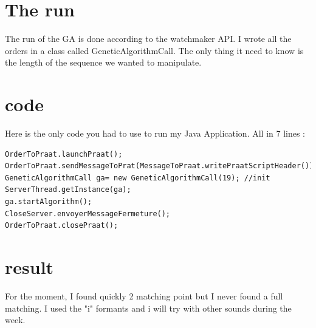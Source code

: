 \documentclass[12pt]{report}
\begin{document}
\section{The run}
The run of the GA is done according to the watchmaker API. I wrote all the orders in a class called GeneticAlgorithmCall. The only thing it need to know is the length of the sequence we wanted to manipulate.

\section{code}
Here is the only code you had to use to run my Java Application. All in 7 lines :

\begin{lstlisting}
OrderToPraat.launchPraat();
OrderToPraat.sendMessageToPrat(MessageToPraat.writePraatScriptHeader());
GeneticAlgorithmCall ga= new GeneticAlgorithmCall(19); //init
ServerThread.getInstance(ga);
ga.startAlgorithm();
CloseServer.envoyerMessageFermeture();
OrderToPraat.closePraat();
\end{lstlisting}

\section{result}
For the moment, I found quickly 2 matching point but I never found a full matching. I used the "i" formants and i will try with other sounds during the week.

\listoffigures

 
\end{document}
